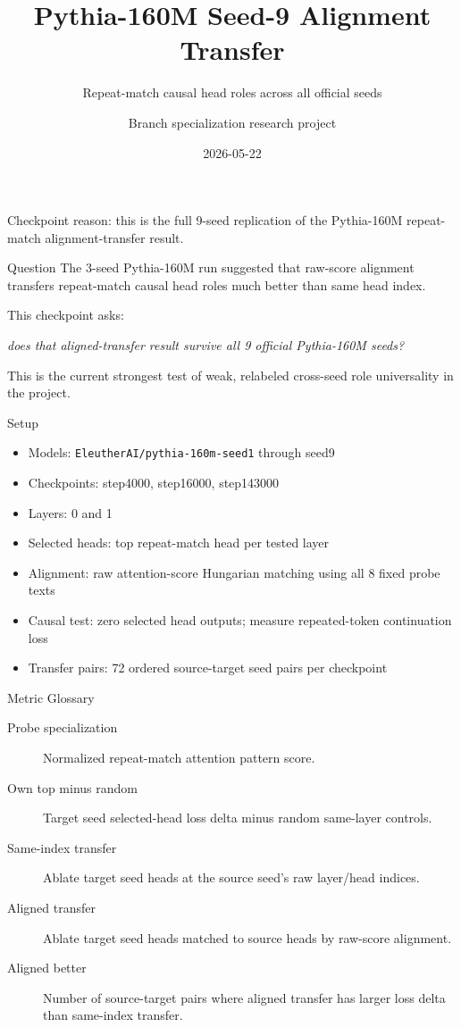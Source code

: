 \documentclass[aspectratio=169]{beamer}
\title[Pythia-160M Seed-9 Alignment]{Pythia-160M Seed-9 Alignment Transfer}
\subtitle{Repeat-match causal head roles across all official seeds}
\author{Branch specialization research project}
\date{2026-05-22}
\begin{document}
\begin{frame}
  \titlepage
  \vspace{-0.5em}
  \small
  Checkpoint reason: this is the full 9-seed replication of the Pythia-160M
  repeat-match alignment-transfer result.
\end{frame}

\begin{frame}{Question}
  The 3-seed Pythia-160M run suggested that raw-score alignment transfers
  repeat-match causal head roles much better than same head index.

  \vspace{0.8em}
  This checkpoint asks:

  \vspace{0.5em}
  \begin{center}
  \textit{does that aligned-transfer result survive all 9 official Pythia-160M
  seeds?}
  \end{center}

  \vspace{0.8em}
  This is the current strongest test of weak, relabeled cross-seed role
  universality in the project.
\end{frame}

\begin{frame}{Setup}
  \begin{itemize}
    \item Models: \texttt{EleutherAI/pythia-160m-seed1} through seed9
    \item Checkpoints: step4000, step16000, step143000
    \item Layers: 0 and 1
    \item Selected heads: top repeat-match head per tested layer
    \item Alignment: raw attention-score Hungarian matching using all 8 fixed
    probe texts
    \item Causal test: zero selected head outputs; measure repeated-token
    continuation loss
    \item Transfer pairs: 72 ordered source-target seed pairs per checkpoint
  \end{itemize}
\end{frame}

\begin{frame}{Metric Glossary}
  \begin{description}
    \item[Probe specialization] Normalized repeat-match attention pattern score.
    \item[Own top minus random] Target seed selected-head loss delta minus random
    same-layer controls.
    \item[Same-index transfer] Ablate target seed heads at the source seed's raw
    layer/head indices.
    \item[Aligned transfer] Ablate target seed heads matched to source heads by
    raw-score alignment.
    \item[Aligned better] Number of source-target pairs where aligned transfer
    has larger loss delta than same-index transfer.
  \end{description}
\end{frame}
\end{document}
